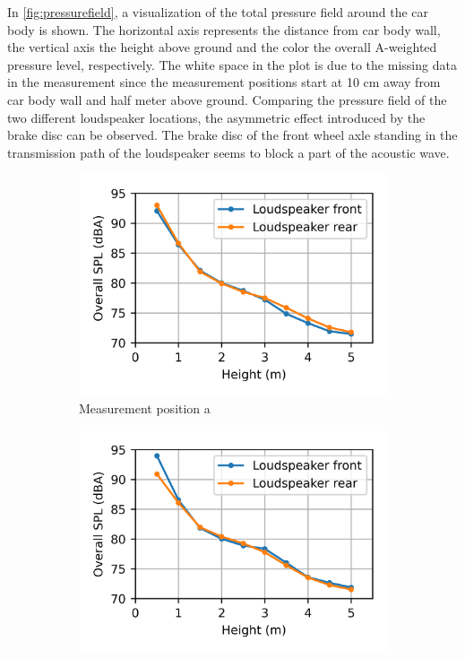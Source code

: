 \noindent In \cref{fig:pressurefield}, a visualization of the total pressure field around the car body is shown. The horizontal axis represents the distance from car body wall, the vertical axis the height above ground and the color the overall A-weighted pressure level, respectively. The white space in the plot is due to the missing data in the measurement since the measurement positions start at 10 cm away from car body wall and half meter above ground. Comparing the pressure field of the two different loudspeaker locations, the asymmetric effect introduced by the brake disc can be observed. The brake disc of the front wheel axle standing in the transmission path of the loudspeaker seems to block a part of the acoustic wave.

\begin{figure}[H]
    \centering
     \begin{subfigure}[b]{0.48\textwidth}
        \centering
        \includegraphics{fig/pressure_over_height_pos_a.png}
        \caption{Measurement position a}
        \label{fig:SPLoverheight_pos_a}
    \end{subfigure}
    \begin{subfigure}[b]{0.48\textwidth}
        \centering
        \includegraphics{fig/pressure_over_height_pos_c.png}

\end{subfigure}
\end{figure}
